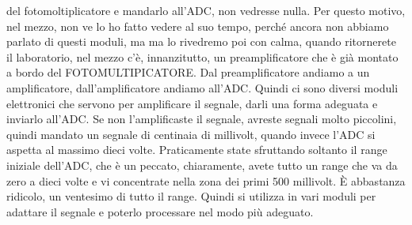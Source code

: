 {del fotomoltiplicatore e mandarlo all'ADC, non vedresse nulla. Per questo motivo, nel mezzo, non ve lo ho fatto vedere al suo tempo, perché ancora non abbiamo parlato di questi moduli, ma ma lo rivedremo poi con calma, quando ritornerete il laboratorio, nel mezzo c'è, innanzitutto, un preamplificatore che è già montato a bordo del FOTOMULTIPICATORE. Dal preamplificatore andiamo a un amplificatore, dall'amplificatore andiamo all'ADC. Quindi ci sono diversi moduli elettronici che servono per amplificare il segnale, darli una forma adeguata e inviarlo all'ADC. Se non l'amplificaste il segnale, avreste segnali molto piccolini, quindi mandato un segnale di centinaia di millivolt, quando invece l'ADC si aspetta al massimo dieci volte. Praticamente state sfruttando soltanto il range iniziale dell'ADC, che è un peccato, chiaramente, avete tutto un range che va da zero a dieci volte e vi concentrate nella zona dei primi 500 millivolt. È abbastanza ridicolo, un ventesimo di tutto il range. Quindi si utilizza in vari moduli per adattare il segnale e poterlo processare nel modo più adeguato. 

}
